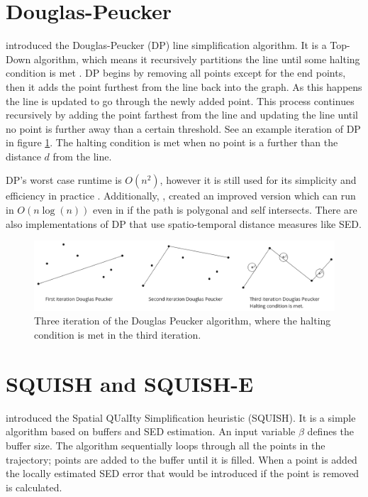 \section{Douglas-Peucker}
\textcite{dp} introduced the Douglas-Peucker (DP) line simplification algorithm. It is a Top-Down algorithm, which means it recursively partitions the line until some halting condition is met \cite{Sun2016}. DP begins by removing all points except for the end points, then it adds the point furthest from the line back into the graph. As this happens the line is updated to go through the newly added point. This process continues recursively by adding the point farthest from the line and updating the line until no point is further away than a certain threshold. See an example iteration of DP in figure \ref{dp}. The halting condition is met when no point is a further than the distance $d$ from the line.

DP's worst case runtime is $O(n^{2})$, however it is still used for its simplicity and efficiency in practice \cite{gudmundsson2009compressing}. Additionally, \textcite{gudmundsson2009compressing}, created an improved version which can run in $O(n\log(n))$ even in if the path is polygonal and self intersects. There are also implementations of DP that use spatio-temporal distance measures like SED.
\begin{figure}[h]
    \includegraphics[width=1.0\linewidth]{./figures/dp.png}
    \caption{Three iteration of the Douglas Peucker algorithm, where the halting condition is met in the third iteration.}
    \label{dp}
\end{figure}

\section{SQUISH and SQUISH-E}
\textcite{muckell2011squish} introduced the Spatial QUalIty Simplification heuristic (SQUISH). It is a simple algorithm based on buffers and SED estimation. An input variable $\beta$ defines the buffer size. The algorithm sequentially loops through all the points in the trajectory; points are added to the buffer until it is filled. When a point is added the locally estimated SED error that would be introduced if the point is removed is calculated.


